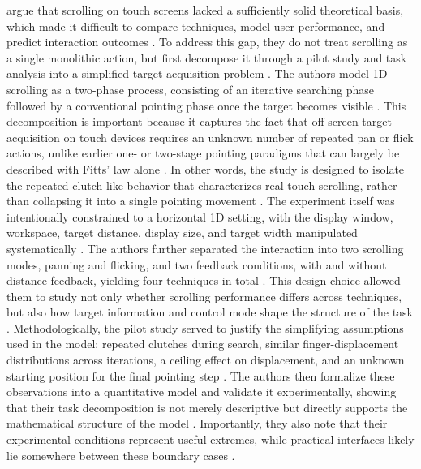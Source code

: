 \citeauthor{zhao2014model} argue that scrolling on touch screens lacked a sufficiently solid theoretical basis, which made it difficult to compare techniques, model user performance, and predict interaction outcomes \cite{zhao2014model}. To address this gap, they do not treat scrolling as a single monolithic action, but first decompose it through a pilot study and task analysis into a simplified target-acquisition problem \cite{zhao2014model}. The authors model 1D scrolling as a two-phase process, consisting of an iterative searching phase followed by a conventional pointing phase once the target becomes visible \cite{zhao2014model}. This decomposition is important because it captures the fact that off-screen target acquisition on touch devices requires an unknown number of repeated pan or flick actions, unlike earlier one- or two-stage pointing paradigms that can largely be described with Fitts' law alone \cite{zhao2014model}. In other words, the study is designed to isolate the repeated clutch-like behavior that characterizes real touch scrolling, rather than collapsing it into a single pointing movement \cite{zhao2014model}. The experiment itself was intentionally constrained to a horizontal 1D setting, with the display window, workspace, target distance, display size, and target width manipulated systematically \cite{zhao2014model}. The authors further separated the interaction into two scrolling modes, panning and flicking, and two feedback conditions, with and without distance feedback, yielding four techniques in total \cite{zhao2014model}. This design choice allowed them to study not only whether scrolling performance differs across techniques, but also how target information and control mode shape the structure of the task \cite{zhao2014model}. Methodologically, the pilot study served to justify the simplifying assumptions used in the model: repeated clutches during search, similar finger-displacement distributions across iterations, a ceiling effect on displacement, and an unknown starting position for the final pointing step \cite{zhao2014model}. The authors then formalize these observations into a quantitative model and validate it experimentally, showing that their task decomposition is not merely descriptive but directly supports the mathematical structure of the model \cite{zhao2014model}. Importantly, they also note that their experimental conditions represent useful extremes, while practical interfaces likely lie somewhere between these boundary cases \cite{zhao2014model}.


